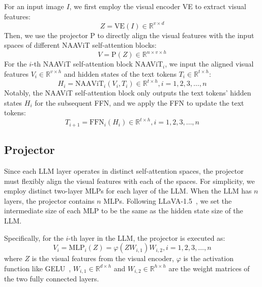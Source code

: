 For an input image $I$, we first employ the visual encoder VE to extract visual features:
\begin{equation}
Z=\text{VE}(I)\in \mathbb{R}^{v \times d}
\end{equation}
Then, we use the projector P to directly align the visual features with the input spaces of different NAAViT self-attention blocks:
\begin{equation}
V=\text{P}(Z)\in \mathbb{R}^{n \times v \times h}
\end{equation}
For the $i$-th NAAViT self-attention block NAAViT$_i$, we input the aligned visual features $V_i\in \mathbb{R}^{v \times h}$ and hidden states of the text tokens $T_i\in \mathbb{R}^{t \times h}$:
\begin{equation}
H_i=\text{NAAViT}_i(V_i,T_i)\in \mathbb{R}^{t \times h}, i=1,2,3,\dots,n
\end{equation}
Notably, the NAAViT self-attention block only outputs the text tokens' hidden states $H_i$ for the subsequent FFN, and we apply the FFN to update the text tokens:
\begin{equation}
T_{i+1}=\text{FFN}_i(H_i)\in \mathbb{R}^{t \times h}, i=1,2,3,\dots,n
\end{equation}

\subsection{Projector}
Since each LLM layer operates in distinct self-attention spaces, the projector must flexibly align the visual features with each of the spaces.
For simplicity, we employ distinct two-layer MLPs for each layer of the LLM. 
When the LLM has $n$ layers, the projector contains $n$ MLPs.
Following LLaVA-1.5~\cite{liu2024improvedbaselinesvisualinstruction}, we set the intermediate size of each MLP to be the same as the hidden state size of the LLM.

Specifically, for the $i$-th layer in the LLM, the projector is executed as:
\begin{equation}
V_i=\text{MLP}_i(Z)= \varphi(Z W_{i,1}) W_{i,2}, i=1,2,3,\dots,n
\end{equation}
where $Z$ is the visual features from the visual encoder, $\varphi$ is the activation function like GELU~\cite{hendrycks2023gaussianerrorlinearunits}, $W_{i,1}\in \mathbb{R}^{d \times h}$ and $W_{i,2}\in \mathbb{R}^{h \times h}$ are the weight matrices of the two fully connected layers.

